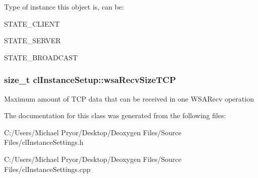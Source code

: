 \label{classcl_instance_setup_a16da9e8e5cd44f8062f02101222102fc}
Type of instance this object is, can be:
\begin{DoxyItemize}
\item {\ttfamily STATE\_\-CLIENT} 
\item {\ttfamily STATE\_\-SERVER} 
\item {\ttfamily STATE\_\-BROADCAST} 
\end{DoxyItemize}\hypertarget{classcl_instance_setup_afe672b3b90ea27d8a7761f1ffc4a4cd6}{
\subsubsection[{wsaRecvSizeTCP}]{\setlength{\rightskip}{0pt plus 5cm}size\_\-t {\bf clInstanceSetup::wsaRecvSizeTCP}}}
\label{classcl_instance_setup_afe672b3b90ea27d8a7761f1ffc4a4cd6}
Maximum amount of TCP data that can be received in one {\ttfamily WSARecv} operation 

The documentation for this class was generated from the following files:\begin{DoxyCompactItemize}
\item 
C:/Users/Michael Pryor/Desktop/Deoxygen Files/Source Files/clInstanceSettings.h\item 
C:/Users/Michael Pryor/Desktop/Deoxygen Files/Source Files/clInstanceSettings.cpp\end{DoxyCompactItemize}
